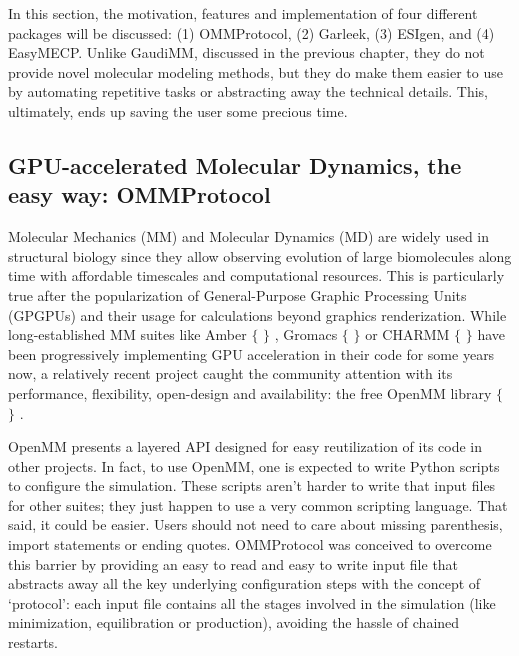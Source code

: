 In this section, the motivation, features and implementation of four different packages will be discussed: (1) OMMProtocol, (2) Garleek, (3) ESIgen, and (4) EasyMECP. Unlike GaudiMM, discussed in the previous chapter, they do not provide novel molecular modeling methods, but they do make them easier to use by automating repetitive tasks or abstracting away the technical details. This, ultimately, ends up saving the user some precious time.

\subsection{GPU-accelerated Molecular Dynamics, the easy way: OMMProtocol}




Molecular Mechanics (MM) and Molecular Dynamics (MD) are widely used in structural biology since they allow observing evolution of large biomolecules along time with affordable timescales and computational resources. This is particularly true after the popularization of General-Purpose Graphic Processing Units (GPGPUs) and their usage for calculations beyond graphics renderization. While long-established MM suites like Amber $ \{ $ $ \} $ , Gromacs $ \{ $ $ \} $  or CHARMM $ \{ $ $ \} $  have been progressively implementing GPU acceleration in their code for some years now, a relatively recent project caught the community attention with its performance, flexibility, open-design and availability: the free OpenMM library $ \{ $ $ \} $ .

OpenMM presents a layered API designed for easy reutilization of its code in other projects. In fact, to use OpenMM, one is expected to write Python scripts to configure the simulation. These scripts aren’t harder to write that input files for other suites; they just happen to use a very common scripting language. That said, it could be easier. Users should not need to care about missing parenthesis, import statements or ending quotes. OMMProtocol was conceived to overcome this barrier by providing an easy to read and easy to write input file that abstracts away all the key underlying configuration steps with the concept of ‘protocol’: each input file contains all the stages involved in the simulation (like minimization, equilibration or production), avoiding the hassle of chained restarts.

